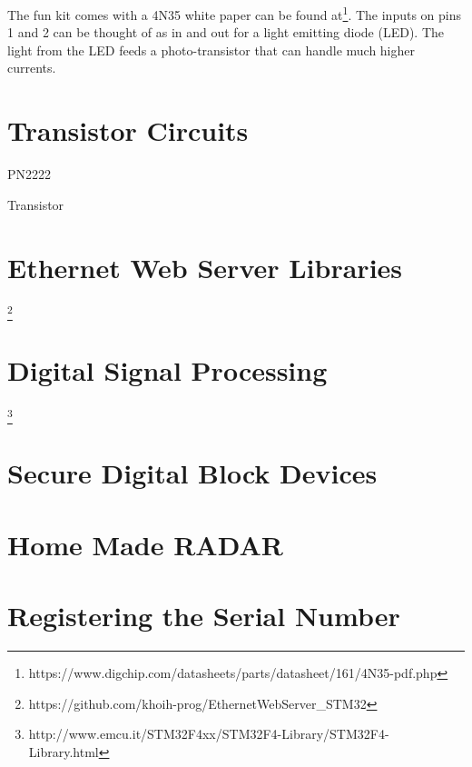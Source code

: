 \documentclass{article}
\begin{document}
The fun kit comes with a 4N35 white paper can be found at\footnote{https://www.digchip.com/datasheets/parts/datasheet/161/4N35-pdf.php}. The inputs on pins 1 and 2 can be thought of as in and out for a light emitting diode (LED).  The light from the LED feeds a photo-transistor that can handle much higher currents. 


\section{Transistor Circuits} %
\label{sec:transistor_circuits}

PN2222

Transistor




\section{Ethernet Web Server Libraries} %
\label{sec:ethernet_web_server_libraries}

\footnote{https://github.com/khoih-prog/EthernetWebServer\_STM32}




\section{Digital Signal Processing} %
\label{sec:digital_signal_processing}

\footnote{http://www.emcu.it/STM32F4xx/STM32F4-Library/STM32F4-Library.html}






\section{Secure Digital Block Devices} %
\label{sec:secure_digital_block_devices}




\section{Home Made RADAR} %
\label{sec:home_made_radar}




\section{Registering the Serial Number} %


\end{document}
